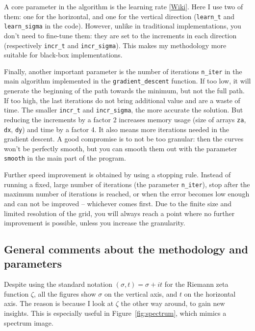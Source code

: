 \documentclass[oneside,10pt]{book}
\begin{document}
A core parameter in the algorithm is the 
\textcolor{index}{learning rate} [\href{https://en.wikipedia.org/wiki/Learning_rate}{Wiki}]. Here I use two of them: one for the horizontal, and one for the vertical direction (\texttt{learn\_t} and \texttt{learn\_sigma} in the code). However, unlike in traditional implementations, you don't need to fine-tune them: they are set to the increments in each direction 
(respectively \texttt{incr\_t} and \texttt{incr\_sigma}). This makes my methodology more suitable for black-box implementations. 

Finally, another important parameter is the number of iterations \texttt{n\_iter} in the main algorithm implemented in the 
\texttt{gradient\_descent} function. If too low, it will generate the beginning of the path towards the minimum, but not the full path. If too high,
 the last iterations do not bring additional value and are a waste of time. The smaller \texttt{incr\_t} and \texttt{incr\_sigma}, the more accurate the solution. But reducing the increments by a factor 2 increases memory usage (size of arrays \texttt{za}, \texttt{dx}, \texttt{dy}) and time by a factor 4. It also means more iterations needed in the gradient descent. A good compromise is to not be too granular: then the
 curves won't be perfectly smooth, but you can smooth them out with the parameter 
\texttt{smooth} in the main part of the program. 

Further speed improvement is obtained by using a stopping rule. Instead of running a fixed, large number of iterations (the parameter \texttt{n\_iter}), stop after the maximum number of iterations is reached, or when the error becomes low enough and can not be improved -- whichever comes first. Due to the finite size and limited resolution of the grid, you will always reach a point where no further improvement is possible, unless you increase the granularity.
 









\subsection{General comments about the methodology and parameters}\label{ppzsdxvb}

Despite using the standard notation $(\sigma, t)=\sigma +it$ for the Riemann zeta function $\zeta$, all the figures show $\sigma$ on the vertical axis, and $t$ on the horizontal axis. The reason is because I look at $\zeta$ the other way around, to gain new insights. This is especially 
 useful in Figure~\ref{fig:spectrum}, which mimics a spectrum image.
\end{document}
